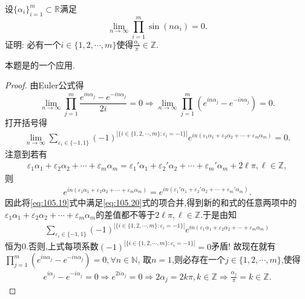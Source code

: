\documentclass[../../main.tex]{subfiles}%
\begin{document}
\begin{example}
设$\{\alpha_i\}_{i=1}^m\subset\mathbb{R}$满足
\[
\lim_{n\to\infty}\prod_{i=1}^m\sin(n\alpha_i)=0.
\]
证明: 必有一个$i\in\{1,2,\cdots,m\}$使得$\frac{\alpha_i}{\pi}\in\mathbb{Z}$.
\end{example}
\begin{note}
本题是的一个应用.
\end{note}
\begin{proof}
由Euler公式得
\[
\lim_{n\to\infty}\prod_{j=1}^m\frac{e^{in\alpha_j}-e^{-in\alpha_j}}{2i}=0\Rightarrow\lim_{n\to\infty}\prod_{j=1}^m(e^{in\alpha_j}-e^{-in\alpha_j})=0.
\]
打开括号得
\begin{align}\label{eq:105.19}
\lim_{n\to\infty}\sum_{\varepsilon_i\in\{-1,1\}}(-1)^{|\{i\in\{1,2,\cdots,m\}:\varepsilon_i=-1\}|}e^{in(\varepsilon_1\alpha_1+\varepsilon_2\alpha_2+\cdots+\varepsilon_m\alpha_m)}=0.
\end{align}
注意到若有
\begin{align}\label{eq:105.20}
\varepsilon _1\alpha _1+\varepsilon _2\alpha _2+\cdots +\varepsilon _m\alpha _m=\varepsilon _1\prime \alpha _1+\varepsilon _2\prime \alpha _2+\cdots +\varepsilon _m\prime \alpha _m+2\ell \pi ,\ell \in \mathbb{Z} ,
\end{align}
则
\begin{align*}
e^{in\left( \varepsilon _1\alpha _1+\varepsilon _2\alpha _2+\cdots +\varepsilon _m\alpha _m \right)}=e^{in\left( \varepsilon _1\prime \alpha _1+\varepsilon _2\prime \alpha _2+\cdots +\varepsilon _m\prime \alpha _m \right)}.
\end{align*}
因此将\eqref{eq:105.19}式中满足\eqref{eq:105.20}式的项合并,得到新的和式的任意两项中的$\varepsilon _1\alpha _1+\varepsilon _2\alpha _2+\cdots +\varepsilon _m\alpha _m$的差值都不等于$2\ell \pi,\ell \in \mathbb{Z}$.于是由知
\begin{align*}
\sum_{\varepsilon_i\in\{-1,1\}}(-1)^{|\{i\in\{1,2,\cdots,m\}:\varepsilon_i=-1\}|}e^{in(\varepsilon_1\alpha_1+\varepsilon_2\alpha_2+\cdots+\varepsilon_m\alpha_m)}
\end{align*}
恒为0.否则,上式每项系数$(-1)^{|\{i\in\{1,2,\cdots,m\}:\varepsilon_i=-1\}|}=0$矛盾!
故现在就有$\prod_{j=1}^m(e^{in\alpha_j}-e^{-in\alpha_j})=0,\forall n\in\mathbb{N}$, 取$n=1$,则必存在一个$j\in\{1,2,\cdots,m\}$,使得
\begin{align*}
e^{i\alpha _j}-e^{-i\alpha _j}=0\Longrightarrow e^{2i\alpha _j}=0\Longrightarrow 2\alpha _j=2k\pi ,k\in \mathbb{Z} \Longrightarrow \frac{\alpha _j}{\pi}=k\in \mathbb{Z} .
\end{align*}
\end{proof}
\end{document}
